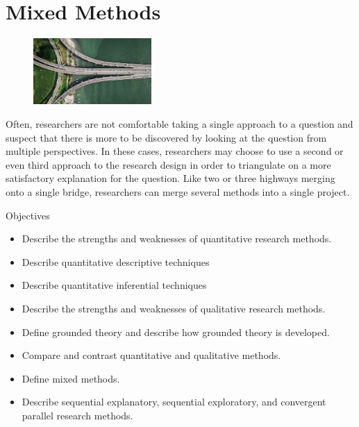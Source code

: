 \chapter{Mixed Methods}\label{ch14:mixed}

\begin{figure}
	\centering
	\includegraphics[width=0.4\textwidth]{gfx/14-intersection} 
\end{figure}

Often, researchers are not comfortable taking a single approach to a question and suspect that there is more to be discovered by looking at the question from multiple perspectives. In these cases, researchers may choose to use a second or even third approach to the research design in order to triangulate on a more satisfactory explanation for the question. Like two or three highways merging onto a single bridge, researchers can merge several methods into a single project.

\begin{center}
	\begin{objbox}{Objectives}
		\begin{itemize}
			\setlength{\itemsep}{0pt}
			\setlength{\parskip}{0pt}
			\setlength{\parsep}{0pt}
			
			\item Describe the strengths and weaknesses of quantitative research methods.
			\item Describe quantitative descriptive techniques
			\item Describe quantitative inferential techniques
			\item Describe the strengths and weaknesses of qualitative research methods.
			\item Define grounded theory and describe how grounded theory is developed.
			\item Compare and contrast quantitative and qualitative methods.
			\item Define mixed methods.
			\item Describe sequential explanatory, sequential exploratory, and convergent parallel research methods.
		\end{itemize}
	\end{objbox}
\end{center}

